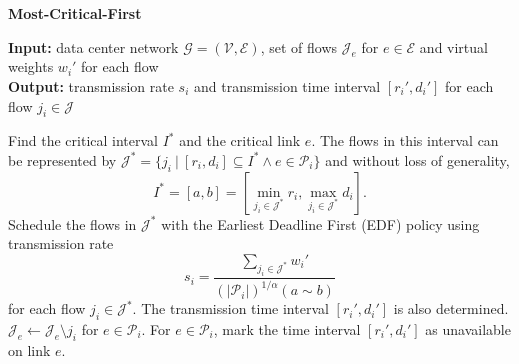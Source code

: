 \documentclass[10pt, conference, compsocconf]{IEEEtran}
\begin{document}
\begin{algorithm}[!t]
\caption{\label{alg:greedy} \textbf{Most-Critical-First}}
\textbf{Input:} data center network $\mathcal{G}=(\mathcal{V},\mathcal{E})$, set of flows $\mathcal{J}_e$ for $e \in \mathcal{E}$ and virtual weights $w_i'$ for each flow\\
\textbf{Output:} transmission rate $s_i$ and transmission time interval $[r_i',d_i']$ for each flow $j_i \in \mathcal{J}$

\begin{algorithmic}[1]
	\STATE Find the critical interval $I^*$ and the critical link $e$. The flows in this interval can be represented by $\mathcal{J}^* = \{j_i~|~[r_i,d_i]\subseteq I^* \wedge e \in \mathcal{P}_i \}$ and without loss of generality, 
	\begin{equation}
		I^* = [a,b] =[\min_{j_i \in \mathcal{J}^*}r_i,\max_{j_i \in \mathcal{J}^*}d_i]. \nonumber
	\end{equation}
	\STATE Schedule the flows in $\mathcal{J}^*$ with the Earliest Deadline First (EDF) policy using transmission rate 
	\begin{equation}
		s_i = \frac{\sum_{j_i \in \mathcal{J}^*} w_i'}{(|\mathcal{P}_i|)^{1/\alpha}(a \sim b)} \nonumber
	\end{equation}
	for each flow $j_i \in \mathcal{J}^*$. The transmission time interval $[r_i',d_i']$ is also determined.
		\STATE $\mathcal{J}_e \leftarrow \mathcal{J}_e \setminus j_i$ for $e \in \mathcal{P}_i$.
		\STATE For $e \in \mathcal{P}_i$, mark the time interval $[r_i',d_i']$ as unavailable on link $e$.
	\ENDFOR
\ENDWHILE
\end{algorithmic}
\end{algorithm}
\end{document}
